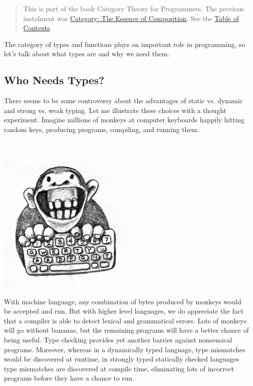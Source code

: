 \begin{quote}
This is part of the book Category Theory for Programmers. The previous
instalment was
\href{https://bartoszmilewski.com/2014/11/04/category-the-essence-of-composition/}{Category:
The Essence of Composition}. See the
\href{https://bartoszmilewski.com/2014/10/28/category-theory-for-programmers-the-preface/}{Table
of Contents}.
\end{quote}

The category of types and functions plays an important role in
programming, so let's talk about what types are and why we need them.

\subsection{Who Needs Types?}\label{who-needs-types}

There seems to be some controversy about the advantages of static vs.
dynamic and strong vs. weak typing. Let me illustrate these choices with
a thought experiment. Imagine millions of monkeys at computer keyboards
happily hitting random keys, producing programs, compiling, and running
them.

\includegraphics[width=2.68750in]{images/img_1329.jpg}

With machine language, any combination of bytes produced by monkeys
would be accepted and run. But with higher level languages, we do
appreciate the fact that a compiler is able to detect lexical and
grammatical errors. Lots of monkeys will go without bananas, but the
remaining programs will have a better chance of being useful. Type
checking provides yet another barrier against nonsensical programs.
Moreover, whereas in a dynamically typed language, type mismatches would
be discovered at runtime, in strongly typed statically checked languages
type mismatches are discovered at compile time, eliminating lots of
incorrect programs before they have a chance to run.

